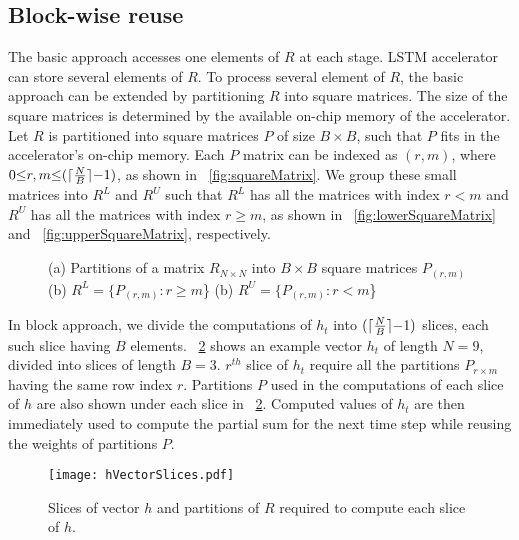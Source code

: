 \subsection{Block-wise reuse}
The basic approach accesses one elements of $R$ at each stage. LSTM accelerator can store several elements of $R$. To process several element of $R$, the basic approach can be extended by partitioning $R$ into square matrices. The size of the square matrices is determined by the available on-chip memory of the accelerator. Let $R$ is partitioned into square matrices $P$ of size $B{\times}B$, such that $P$ fits in the accelerator's on-chip memory. Each $P$ matrix can be indexed as $(r,m)$, where $0{\le}r,m{\le} (\lceil\frac{N}{B}\rceil{-}1)$, as shown in \figurename{~\ref{fig:squareMatrix}}. We group these small matrices into $R^L$ and $R^U$ such that $R^L$ has all the matrices with index $r{<}m$  and $R^U$ has all the matrices with index $r{\geq}m$, as shown in \figurename{~\ref{fig:lowerSquareMatrix}} and \figurename{~\ref{fig:upperSquareMatrix}}, respectively.
\begin{figure}[htb!]
	\centering
	\caption{(a) Partitions of a matrix $R_{N{\times}N}$ into $B{\times}B$ square matrices $P_{(r,m)}$ (b) $R^L{=}\{P_{(r,m)}:r{\geq}m$\} (b) $R^U{=}\{P_{(r,m)}:r{<}m$\}	}
	\label{fig:SquareMatrices}
	\vspace{-1.0em}	
\end{figure} 

In block approach, we divide the computations of $h_t$ into $(\lceil\frac{N}{B}\rceil{-}1)$ slices, each such slice having $B$ elements. \figurename{~\ref{fig:hVectorSlices}} shows an example vector $h_t$ of length $N{=}9$, divided into slices of length $B{=}3$. $r^{th}$ slice of $h_t$ require all the partitions $P_{r{\times}m}$ having the same row index $r$. Partitions $P$ used in the computations of each slice of $h$ are also shown under each slice in \figurename{~\ref{fig:hVectorSlices}}. Computed values of $h_t$ are then immediately used to compute the partial sum for the next time step while reusing the weights of partitions $P$.  
\begin{figure}[!htb]
	\centerline{\texttt{[image: hVectorSlices.pdf]}}
	\caption{Slices of vector $h$ and partitions of $R$ required to compute each slice of $h$.}
	\label{fig:hVectorSlices}
	\vspace{-1.0em}	
\end{figure}

